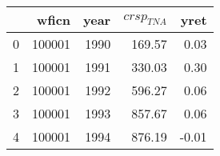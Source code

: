 \begin{tabular}{lrrrr}
\toprule
 & wficn & year & $crsp_{TNA}$ & yret \\
\midrule
0 & 100001 & 1990 & 169.57 & 0.03 \\
1 & 100001 & 1991 & 330.03 & 0.30 \\
2 & 100001 & 1992 & 596.27 & 0.06 \\
3 & 100001 & 1993 & 857.67 & 0.06 \\
4 & 100001 & 1994 & 876.19 & -0.01 \\
\bottomrule
\end{tabular}
